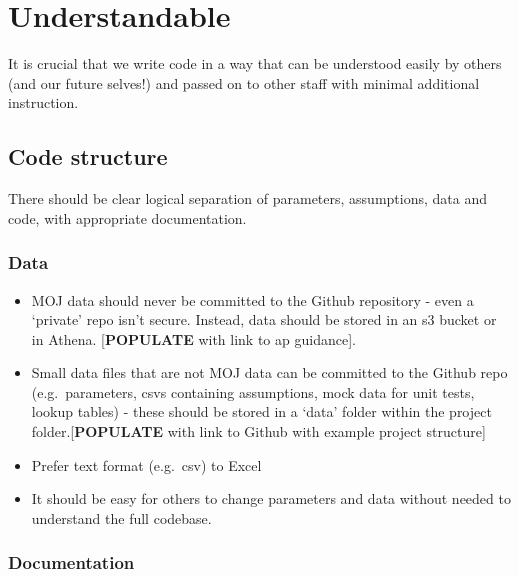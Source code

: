 \documentclass[]{book}
\begin{document}
\hypertarget{understand}{%
\chapter{Understandable}\label{understand}}

It is crucial that we write code in a way that can be understood easily by others (and our future selves!) and passed on to other staff with minimal additional instruction.

\hypertarget{structure2}{%
\section{Code structure}\label{structure2}}

There should be clear logical separation of parameters, assumptions, data and code, with appropriate documentation.

\hypertarget{data}{%
\subsection*{Data}\label{data}}

\begin{itemize}
\item
  MOJ data should never be committed to the Github repository - even a `private' repo isn't secure. Instead, data should be stored in an s3 bucket or in Athena. {[}\textbf{POPULATE} with link to ap guidance{]}.
\item
  Small data files that are not MOJ data can be committed to the Github repo (e.g.~parameters, csvs containing assumptions, mock data for unit tests, lookup tables) - these should be stored in a `data' folder within the project folder.{[}\textbf{POPULATE} with link to Github with example project structure{]}
\item
  Prefer text format (e.g.~csv) to Excel\\
\item
  It should be easy for others to change parameters and data without needed to understand the full codebase.
\end{itemize}

\hypertarget{readme}{%
\subsection*{Documentation}\label{readme}}
\end{document}
